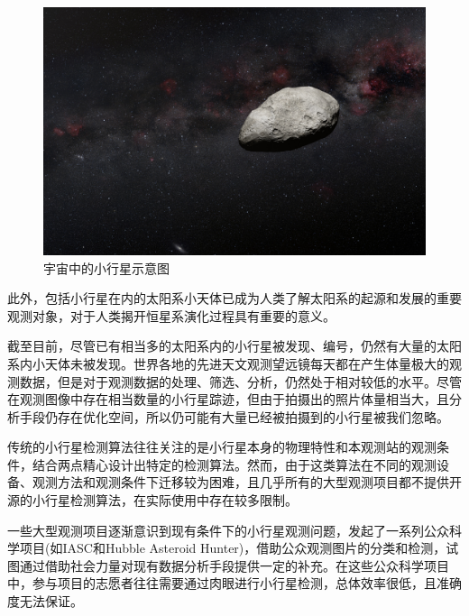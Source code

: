 \documentclass[12pt,a4paper]{article}%
\begin{document}
\begin{figure}[H]%
    \centering
    \begin{minipage}{0.83\textwidth}%
        \centering
        \includegraphics[width=1.0%
            \textwidth]{asteroid}%
        \caption{\fontsize{10pt}{15pt}\selectfont 宇宙中的小行星示意图}%
    \end{minipage}
\end{figure}

此外，包括小行星在内的太阳系小天体已成为人类了解太阳系的起源和发展的重要观测对象，对于人类揭开恒星系演化过程具有重要的意义。

截至目前，尽管已有相当多的太阳系内的小行星被发现、编号，仍然有大量的太阳系内小天体未被发现。世界各地的先进天文观测望远镜每天都在产生体量极大的观测数据，但是对于观测数据的处理、筛选、分析，仍然处于相对较低的水平。尽管在观测图像中存在相当数量的小行星踪迹，但由于拍摄出的照片体量相当大，且分析手段仍存在优化空间，所以仍可能有大量已经被拍摄到的小行星被我们忽略。

传统的小行星检测算法往往关注的是小行星本身的物理特性和本观测站的观测条件，结合两点精心设计出特定的检测算法。然而，由于这类算法在不同的观测设备、观测方法和观测条件下迁移较为困难，且几乎所有的大型观测项目都不提供开源的小行星检测算法，在实际使用中存在较多限制。

一些大型观测项目逐渐意识到现有条件下的小行星观测问题，发起了一系列公众科学项目(如IASC和Hubble Asteroid Hunter)，借助公众观测图片的分类和检测，试图通过借助社会力量对现有数据分析手段提供一定的补充。在这些公众科学项目中，参与项目的志愿者往往需要通过肉眼进行小行星检测，总体效率很低，且准确度无法保证。
\end{document}

